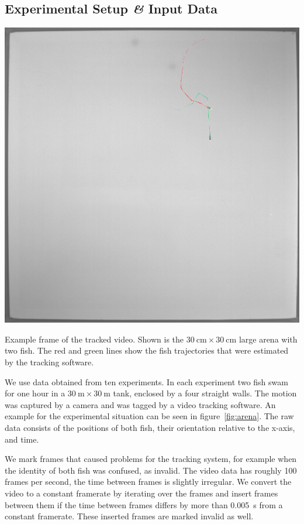 \documentclass[nobib, a4paper]{tufte-handout}
\begin{document}
\subsection{Experimental Setup \textit{\&} Input Data}
\begin{marginfigure}
\includegraphics[width=\columnwidth]{tracked_frame}
\caption{Example frame of the tracked video.
  Shown is the \(\SI{30}{\cm} \times \SI{30}{\cm}\) large arena with two fish.
  The red and green lines show the fish trajectories that were estimated by the tracking software.
\label{fig:arena}}
\end{marginfigure}

We use data obtained from ten experiments.
In each experiment two fish swam for one hour in a \(\SI{30}{\m} \times \SI{30}{\m}\) tank, enclosed by a four straight walls.
The motion was captured by a camera and was tagged by a video tracking software.
An example for the experimental situation can be seen in figure~\ref{fig:arena}.
The raw data consists of the positions of both fish, their orientation relative to the x-axis, and time.

We mark frames that caused problems for the tracking system, for example when the identity of both fish was confused, as invalid.
The video data has roughly 100 frames per second, the time between frames is slightly irregular.
We convert the video to a constant framerate by iterating over the frames and insert frames between them if the time between frames differs by more than \SI{0.005}{\s} from a constant framerate.
These inserted frames are marked invalid as well.
\end{document}
